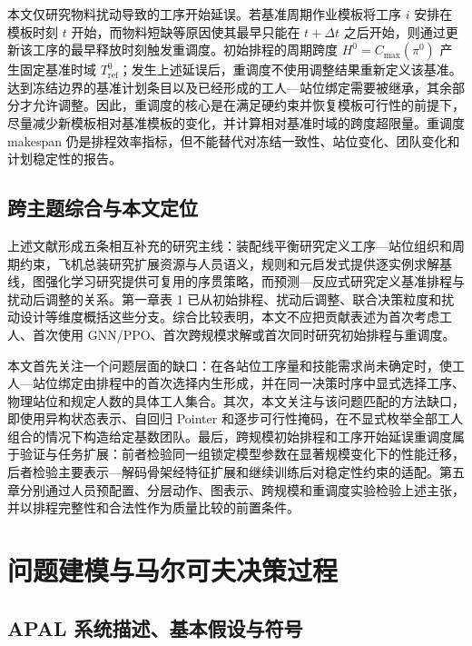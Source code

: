 \documentclass[journal,10pt]{IEEEtran}
\begin{document}
本文仅研究物料扰动导致的工序开始延误。若基准周期作业模板将工序 \(i\) 安排在模板时刻 \(t\) 开始，而物料短缺等原因使其最早只能在 \(t+\Delta t\) 之后开始，则通过更新该工序的最早释放时刻触发重调度。初始排程的周期跨度 \(H^0=C_{\max}(\pi^0)\) 产生固定基准时域 \(T_{\mathrm{ref}}^0\)；发生上述延误后，重调度不使用调整结果重新定义该基准。达到冻结边界的基准计划条目以及已经形成的工人---站位绑定需要被继承，其余部分才允许调整。因此，重调度的核心是在满足硬约束并恢复模板可行性的前提下，尽量减少新模板相对基准模板的变化，并计算相对基准时域的跨度超限量。重调度 makespan 仍是排程效率指标，但不能替代对冻结一致性、站位变化、团队变化和计划稳定性的报告。

\subsection{跨主题综合与本文定位}\label{ux8de8ux4e3bux9898ux7efcux5408ux4e0eux672cux6587ux5b9aux4f4d}

上述文献形成五条相互补充的研究主线：装配线平衡研究定义工序---站位组织和周期约束，飞机总装研究扩展资源与人员语义，规则和元启发式提供逐实例求解基线，图强化学习研究提供可复用的序贯策略，而预测---反应式研究定义基准排程与扰动后调整的关系。第一章表 1 已从初始排程、扰动后调整、联合决策粒度和扰动设计等维度概括这些分支。综合比较表明，本文不应把贡献表述为首次考虑工人、首次使用 GNN/PPO、首次跨规模求解或首次同时研究初始排程与重调度。

本文首先关注一个问题层面的缺口：在各站位工序量和技能需求尚未确定时，使工人---站位绑定由排程中的首次选择内生形成，并在同一决策时序中显式选择工序、物理站位和规定人数的具体工人集合。其次，本文关注与该问题匹配的方法缺口，即使用异构状态表示、自回归 Pointer 和逐步可行性掩码，在不显式枚举全部工人组合的情况下构造给定基数团队。最后，跨规模初始排程和工序开始延误重调度属于验证与任务扩展：前者检验同一组锁定模型参数在显著规模变化下的性能迁移，后者检验主要表示---解码骨架经特征扩展和继续训练后对稳定性约束的适配。第五章分别通过人员预配置、分层动作、图表示、跨规模和重调度实验检验上述主张，并以排程完整性和合法性作为质量比较的前置条件。

\section{问题建模与马尔可夫决策过程}\label{ux95eeux9898ux5efaux6a21ux4e0eux9a6cux5c14ux53efux592bux51b3ux7b56ux8fc7ux7a0b}

\subsection{APAL 系统描述、基本假设与符号}\label{apal-ux7cfbux7edfux63cfux8ff0ux57faux672cux5047ux8bbeux4e0eux7b26ux53f7}
\end{document}
